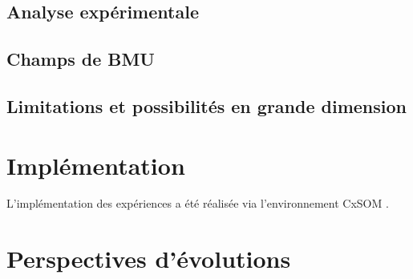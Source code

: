 \subsection{Analyse expérimentale}

\subsection{Champs de BMU}

\subsection{Limitations et possibilités en grande dimension}

\section{Implémentation}

L'implémentation des expériences a été réalisée via l'environnement CxSOM \cite{cxsom}.

\section{Perspectives d'évolutions}
